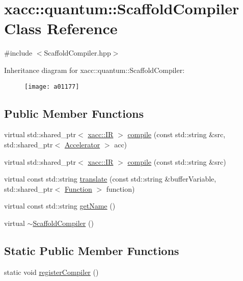 \hypertarget{a01177}{}\section{xacc\+:\+:quantum\+:\+:Scaffold\+Compiler Class Reference}
\label{a01177}


{\ttfamily \#include $<$Scaffold\+Compiler.\+hpp$>$}

Inheritance diagram for xacc\+:\+:quantum\+:\+:Scaffold\+Compiler\+:\begin{figure}[H]
\begin{center}
\leavevmode
\texttt{[image: a01177]}
\end{center}
\end{figure}
\subsection*{Public Member Functions}
\begin{DoxyCompactItemize}
\item 
virtual std\+::shared\+\_\+ptr$<$ \hyperlink{a01677}{xacc\+::\+IR} $>$ \hyperlink{a01177_a7caede75bb2304ba405966651b115543}{compile} (const std\+::string \&src, std\+::shared\+\_\+ptr$<$ \hyperlink{a01613}{Accelerator} $>$ acc)
\item 
virtual std\+::shared\+\_\+ptr$<$ \hyperlink{a01677}{xacc\+::\+IR} $>$ \hyperlink{a01177_a3736ecc229fe6acdd4c991e85d7a1f08}{compile} (const std\+::string \&src)
\item 
virtual const std\+::string \hyperlink{a01177_ac7ca2941e987ba579c6f50cfbd7fb0dc}{translate} (const std\+::string \&buffer\+Variable, std\+::shared\+\_\+ptr$<$ \hyperlink{a01653}{Function} $>$ function)
\item 
virtual const std\+::string \hyperlink{a01177_a3f537054a3924a1d14f4ceb0f0181161}{get\+Name} ()
\item 
virtual \hyperlink{a01177_afb26398b07377ab9ddebc43a9376a6dd}{$\sim$\+Scaffold\+Compiler} ()
\end{DoxyCompactItemize}
\subsection*{Static Public Member Functions}
\begin{DoxyCompactItemize}
\item 
static void \hyperlink{a01177_aed16dda1e919e5af6de9953a656f62ce}{register\+Compiler} ()
\end{DoxyCompactItemize}
